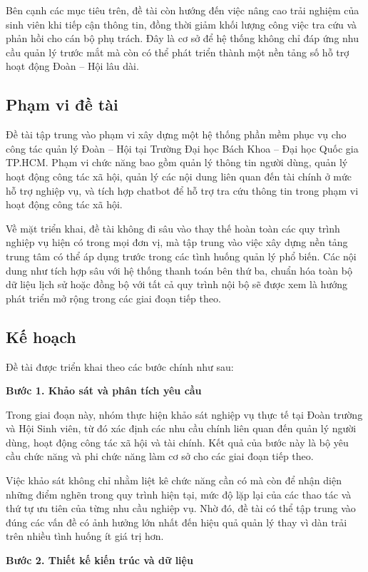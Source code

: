 Bên cạnh các mục tiêu trên, đề tài còn hướng đến việc nâng cao trải nghiệm của sinh viên khi tiếp cận thông tin, đồng thời giảm khối lượng công việc tra cứu và phản hồi cho cán bộ phụ trách. Đây là cơ sở để hệ thống không chỉ đáp ứng nhu cầu quản lý trước mắt mà còn có thể phát triển thành một nền tảng số hỗ trợ hoạt động Đoàn -- Hội lâu dài.

\subsection{Phạm vi đề tài}
Đề tài tập trung vào phạm vi xây dựng một hệ thống phần mềm phục vụ cho công tác quản lý Đoàn -- Hội tại Trường Đại học Bách Khoa -- Đại học Quốc gia TP.HCM. Phạm vi chức năng bao gồm quản lý thông tin người dùng, quản lý hoạt động công tác xã hội, quản lý các nội dung liên quan đến tài chính ở mức hỗ trợ nghiệp vụ, và tích hợp chatbot để hỗ trợ tra cứu thông tin trong phạm vi hoạt động công tác xã hội.

Về mặt triển khai, đề tài không đi sâu vào thay thế hoàn toàn các quy trình nghiệp vụ hiện có trong mọi đơn vị, mà tập trung vào việc xây dựng nền tảng trung tâm có thể áp dụng trước trong các tình huống quản lý phổ biến. Các nội dung như tích hợp sâu với hệ thống thanh toán bên thứ ba, chuẩn hóa toàn bộ dữ liệu lịch sử hoặc đồng bộ với tất cả quy trình nội bộ sẽ được xem là hướng phát triển mở rộng trong các giai đoạn tiếp theo.

\subsection{Kế hoạch}
Đề tài được triển khai theo các bước chính như sau:

\textbf{Bước 1. Khảo sát và phân tích yêu cầu}

Trong giai đoạn này, nhóm thực hiện khảo sát nghiệp vụ thực tế tại Đoàn trường và Hội Sinh viên, từ đó xác định các nhu cầu chính liên quan đến quản lý người dùng, hoạt động công tác xã hội và tài chính. Kết quả của bước này là bộ yêu cầu chức năng và phi chức năng làm cơ sở cho các giai đoạn tiếp theo.

Việc khảo sát không chỉ nhằm liệt kê chức năng cần có mà còn để nhận diện những điểm nghẽn trong quy trình hiện tại, mức độ lặp lại của các thao tác và thứ tự ưu tiên của từng nhu cầu nghiệp vụ. Nhờ đó, đề tài có thể tập trung vào đúng các vấn đề có ảnh hưởng lớn nhất đến hiệu quả quản lý thay vì dàn trải trên nhiều tình huống ít giá trị hơn.

\textbf{Bước 2. Thiết kế kiến trúc và dữ liệu}

